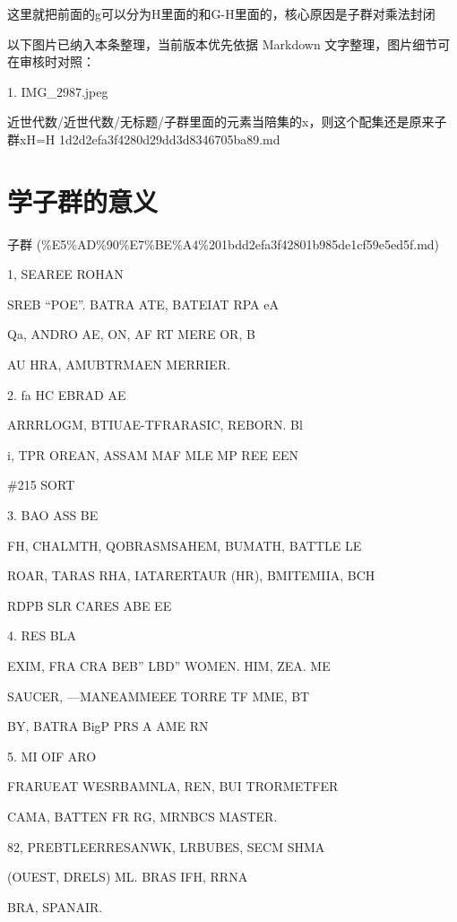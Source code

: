 \begin{note}[子群里面的元素当陪集的x，则这个配集还是原来子群xH=H]

这里就把前面的g可以分为H里面的和G-H里面的，核心原因是子群对乘法封闭

\end{note}

\begin{note}[关联图片]
以下图片已纳入本条整理，当前版本优先依据 Markdown 文字整理，图片细节可在审核时对照：

1. IMG\_2987.jpeg\\

\end{note}

\begin{note}[来源路径]

近世代数/近世代数/无标题/子群里面的元素当陪集的x，则这个配集还是原来子群xH=H 1d2d2efa3f4280d29dd3d8346705ba89.md

\end{note}

\section*{学子群的意义}

\begin{note}[来源上级主题]

子群 (\%E5\%AD\%90\%E7\%BE\%A4\%201bdd2efa3f42801b985de1cf59e5ed5f.md)

\end{note}

\begin{note}[学子群的意义]

1, SEAREE ROHAN

SREB “POE”. BATRA ATE, BATEIAT RPA eA

Qa, ANDRO AE, ON, AF RT MERE OR, B

AU HRA, AMUBTRMAEN MERRIER.

2. fa HC EBRAD AE

ARRRLOGM, BTIUAE-TFRARASIC, REBORN. Bl

i, TPR OREAN, ASSAM MAF MLE MP REE EEN

\#215 SORT

3. BAO ASS BE

FH, CHALMTH, QOBRASMSAHEM, BUMATH, BATTLE LE

ROAR, TARAS RHA, IATARERTAUR (HR), BMITEMIIA, BCH

RDPB SLR CARES ABE EE

4. RES BLA

EXIM, FRA CRA BEB” LBD” WOMEN. HIM, ZEA. ME

SAUCER, —MANEAMMEEE TORRE TF MME, BT

BY, BATRA BigP PRS A AME RN

5. MI OIF ARO

FRARUEAT WESRBAMNLA, REN, BUI TRORMETFER

CAMA, BATTEN FR RG, MRNBCS MASTER.

82, PREBTLEERRESANWK, LRBUBES, SECM SHMA

(OUEST, DRELS) ML. BRAS IFH, RRNA

BRA, SPANAIR.

\end{note}

